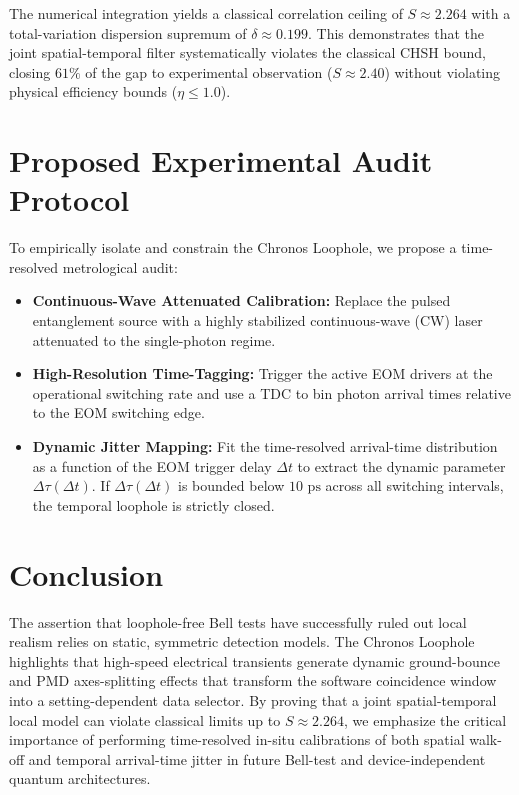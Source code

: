 \documentclass[aps,pra,reprint,superscriptaddress,amsmath,amssymb,floatfix]{revtex4-2}
\begin{document}
The numerical integration yields a classical correlation ceiling of $S \approx 2.264$ with a total-variation dispersion supremum of $\delta \approx 0.199$. This demonstrates that the joint spatial-temporal filter systematically violates the classical CHSH bound, closing $61\%$ of the gap to experimental observation ($S \approx 2.40$) without violating physical efficiency bounds ($\eta \le 1.0$).

\section{Proposed Experimental Audit Protocol}

To empirically isolate and constrain the Chronos Loophole, we propose a time-resolved metrological audit:
\begin{itemize}
\item \textbf{Continuous-Wave Attenuated Calibration:} Replace the pulsed entanglement source with a highly stabilized continuous-wave (CW) laser attenuated to the single-photon regime.
\item \textbf{High-Resolution Time-Tagging:} Trigger the active EOM drivers at the operational switching rate and use a TDC to bin photon arrival times relative to the EOM switching edge.
\item \textbf{Dynamic Jitter Mapping:} Fit the time-resolved arrival-time distribution as a function of the EOM trigger delay $\Delta t$ to extract the dynamic parameter $\Delta \tau(\Delta t)$. If $\Delta \tau(\Delta t)$ is bounded below $10\text{ ps}$ across all switching intervals, the temporal loophole is strictly closed.
\end{itemize}

\section{Conclusion}

The assertion that loophole-free Bell tests have successfully ruled out local realism relies on static, symmetric detection models. The Chronos Loophole highlights that high-speed electrical transients generate dynamic ground-bounce and PMD axes-splitting effects that transform the software coincidence window into a setting-dependent data selector. By proving that a joint spatial-temporal local model can violate classical limits up to $S \approx 2.264$, we emphasize the critical importance of performing time-resolved in-situ calibrations of both spatial walk-off and temporal arrival-time jitter in future Bell-test and device-independent quantum architectures.
\end{document}
